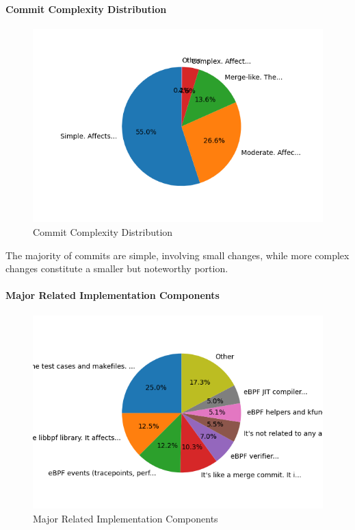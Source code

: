 \paragraph{Commit Complexity Distribution}

\begin{figure}[ht]
    \centering
    \includegraphics[width=\linewidth]{feature-analysis/commit_pie_chart_commit_complexity.png}
    \caption{Commit Complexity Distribution}
    \label{fig:commit_pie_chart_commit_complexity}
\end{figure}

The majority of commits are simple, involving small changes, while more complex changes constitute a smaller but noteworthy portion.

\paragraph{Major Related Implementation Components}

\begin{figure}[ht]
    \centering
    \includegraphics[width=\linewidth]{feature-analysis/commit_pie_chart_major_implementation_component.png}
    \caption{Major Related Implementation Components}
    \label{fig:commit_pie_chart_major_implementation_component}
\end{figure}

